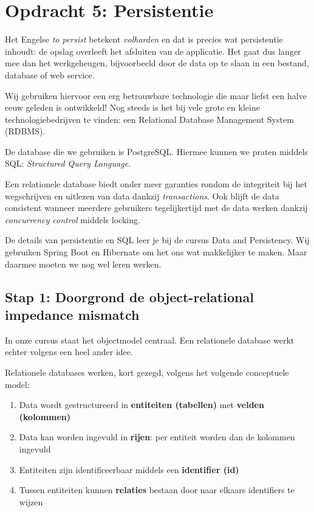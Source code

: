 \documentclass[dutch,a4paper,12pt,doubleside]{book}
\begin{document}
\setcounter{chapter}{4}
\chapter{Opdracht 5: Persistentie}
Het Engelse \textit{to persist} betekent \textit{volharden} 
en dat is precies wat persistentie inhoudt:
de opslag overleeft het afsluiten van de applicatie.
Het gaat dus langer mee dan het werkgeheugen, bijvoorbeeld 
door de data op te slaan in een bestand, database of web service.

Wij gebruiken hiervoor een erg betrouwbare technologie die
maar liefst een halve eeuw geleden is ontwikkeld! Nog steeds 
is het bij vele grote en kleine technologiebedrijven te vinden: 
een Relational Database Management System (RDBMS).

De database die we gebruiken is PostgreSQL. 
Hiermee kunnen we praten middels SQL:
\textit{Structured Query Language}.

Een relationele database biedt onder meer garanties rondom de 
integriteit bij het wegschrijven en uitlezen van data 
dankzij \textit{transactions}. Ook blijft de data consistent 
wanneer meerdere gebruikers tegelijkertijd met de data werken
dankzij \textit{concurrency control} middels locking.

De details van persistentie en SQL leer je bij de cursus 
Data and Persistency. Wij gebruiken Spring Boot en Hibernate
om het ons wat makkelijker te maken. Maar daarmee moeten we nog 
wel leren werken.

\newpage

\section{Stap 1: Doorgrond de object-relational impedance mismatch}
In onze cursus staat het objectmodel centraal. Een relationele database 
werkt echter volgens een heel ander idee.

Relationele databases werken, kort gezegd, volgens het volgende conceptuele model:
\begin{enumerate}
    \item Data wordt gestructureerd in \textbf{entiteiten (tabellen)} met \textbf{velden (kolommen)}
    \item Data kan worden ingevuld in \textbf{rijen}: per entiteit worden dan de kolommen ingevuld
    \item Entiteiten zijn identificeerbaar middels een \textbf{identifier (id)}
    \item Tussen entiteiten kunnen \textbf{relaties} bestaan door naar elkaars identifiers te wijzen
\end{enumerate}
\end{document}
